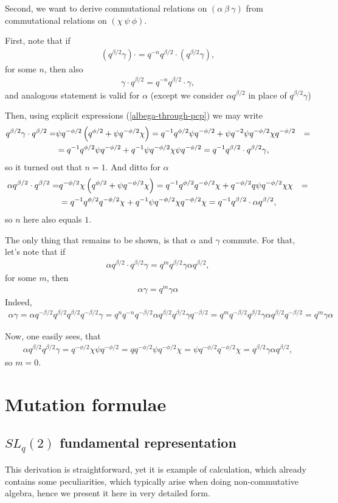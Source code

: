 \documentclass{article}
\newcommand{\lb}{\left (}
\newcommand{\rb}{\right )}
\newcommand{\be}{\begin{eqnarray}}
\newcommand{\ee}{\end{eqnarray}}
\newcommand {\?}{\textit{???}}
\newcommand{\delabel}[1]{(\ref{#1})}
\begin{document}
Second, we want to derive commutational relations on $(\alpha\ \beta\ \gamma)$ from commutational
relations on $(\chi\ \psi\ \phi)$.

First, note that if
\be
\lb q^{\beta/2}\gamma \rb \cdot = q^{-n} q^{\beta/2} \cdot \lb q^{\beta/2}\gamma \rb,
\ee
for some $n$, then also
\be
 \gamma \cdot q^{\beta/2} = q^{-n} q^{\beta/2} \cdot \gamma,
\ee
and analogous statement is valid for $\alpha$
 (except we consider $\alpha q^{\beta/2}$ in place of $q^{\beta/2} \gamma$) 

Then, using explicit expressions \delabel{albega-through-pcp} we may write
\be
q^{\beta/2} \gamma \cdot q^{\beta/2} = & \psi q^{-\phi/2} \qbHalf
= q^{-1} q^{\phi/2} \psi q^{-\phi/2} + \psi q^{-2} \psi q^{-\phi/2} \chi q^{-\phi/2} & = \\
& = q^{-1} q^{\phi/2} \psi q^{-\phi/2} + q^{-1} \psi q^{-\phi/2} \chi \psi q^{-\phi/2} = q^{-1} q^{\beta/2} \cdot q^{\beta/2} \gamma,
\ee
so it turned out that $n = 1$. And ditto for $\alpha$
\be
\alpha q^{\beta/2} \cdot q^{\beta/2} = & q^{-\phi/2} \chi \qbHalf
= q^{-1} q^{\phi/2} q^{-\phi/2} \chi + q^{-\phi/2} q \psi q^{-\phi/2} \chi \chi & = \\
& = q^{-1} q^{\phi/2} q^{-\phi/2} \chi + q^{-1} \psi q^{-\phi/2} \chi q^{-\phi/2} \chi
= q^{-1} q^{\beta/2} \cdot \alpha q^{\beta/2},
\ee
so $n$ here also equals $1$.

The only thing that remains to be shown, is that $\alpha$ and $\gamma$ commute.
For that, let's note that if
\be
\alpha q^{\beta/2} \cdot q^{\beta/2} \gamma = q^m q^{\beta/2} \gamma \alpha q^{\beta/2},
\ee
for some $m$, then
\be
\alpha \gamma = q^m \gamma \alpha
\ee
Indeed,
\be
\alpha \gamma = \alpha q^{-\beta/2} q^{\beta/2} q^{\beta/2} q^{-\beta/2} \gamma
= q^n q^{-n} q^{-\beta/2} \alpha q^{\beta/2} q^{\beta/2} \gamma q^{-\beta/2}
= q^m q^{-\beta/2} q^{\beta/2} \gamma \alpha q^{\beta/2} q^{-\beta/2} = q^m \gamma \alpha
\ee

Now, one easily sees, that
\be
\alpha q^{\beta/2} q^{\beta/2} \gamma = q^{-\phi/2} \chi \psi q^{-\phi/2} = q q^{-\phi/2} \psi q^{-\phi/2} \chi
= \psi q^{-\phi/2} q^{-\phi/2} \chi = q^{\beta/2} \gamma \alpha q^{\beta/2},
\ee
so $m = 0$.

\section{Mutation formulae}
\label{sec:mutation-formulae}
\subsection{$SL_q(2)$ fundamental representation}
\label{derivation-of-quantum-mutation-sl2}
This derivation is straightforward, yet it is example of calculation,
which already contains some peculiarities, which typically arise when doing non-commutative algebra,
hence we present it here in very detailed form.
\end{document}
